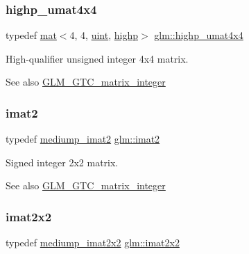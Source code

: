 \subsubsection{\texorpdfstring{highp\+\_\+umat4x4}{highp\_umat4x4}}
{\footnotesize\ttfamily typedef \hyperlink{structglm_1_1mat}{mat}$<$4, 4, \hyperlink{group__core__precision_ga4fd29415871152bfb5abd588334147c8}{uint}, \hyperlink{namespaceglm_a36ed105b07c7746804d7fdc7cc90ff25ac6f7eab42eacbb10d59a58e95e362074}{highp}$>$ \hyperlink{group__gtc__matrix__integer_gada50011594ccf358c9eafe49ff07999f}{glm\+::highp\+\_\+umat4x4}}

High-\/qualifier unsigned integer 4x4 matrix. \begin{DoxySeeAlso}{See also}
\hyperlink{group__gtc__matrix__integer}{G\+L\+M\+\_\+\+G\+T\+C\+\_\+matrix\+\_\+integer} 
\end{DoxySeeAlso}
\mbox{\label{group__gtc__matrix__integer_ga77a581b3366fb63fc72f8f20830003e0}} 
\subsubsection{\texorpdfstring{imat2}{imat2}}
{\footnotesize\ttfamily typedef \hyperlink{group__gtc__matrix__integer_ga74e065ab9524e6b7bd5a84cffb758e71}{mediump\+\_\+imat2} \hyperlink{group__gtc__matrix__integer_ga77a581b3366fb63fc72f8f20830003e0}{glm\+::imat2}}

Signed integer 2x2 matrix. \begin{DoxySeeAlso}{See also}
\hyperlink{group__gtc__matrix__integer}{G\+L\+M\+\_\+\+G\+T\+C\+\_\+matrix\+\_\+integer} 
\end{DoxySeeAlso}
\mbox{\label{group__gtc__matrix__integer_gaf7f44f44d966377666d41ed059524732}} 
\subsubsection{\texorpdfstring{imat2x2}{imat2x2}}
{\footnotesize\ttfamily typedef \hyperlink{group__gtc__matrix__integer_gafe326375aa42c0abbe571d376f4cbd95}{mediump\+\_\+imat2x2} \hyperlink{group__gtc__matrix__integer_gaf7f44f44d966377666d41ed059524732}{glm\+::imat2x2}}

